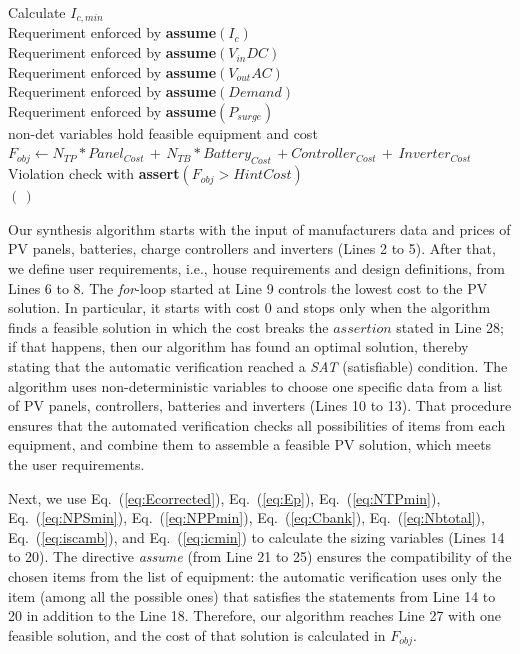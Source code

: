 \documentclass[10pt,conference]{IEEEtran}
\begin{document}
\begin{algorithm}
\begin{algorithmic}[1]
\begin{scriptsize}
 	\STATE Calculate $I_{c,min}$ \\
 	\STATE Requeriment enforced by \textbf{assume}$(I_{c})$ \\
	\STATE Requeriment enforced by \textbf{assume}$(V_{in}DC)$ \\
	\STATE Requeriment enforced by \textbf{assume}$(V_{out}AC)$ \\
	\STATE Requeriment enforced by \textbf{assume}$(Demand)$ \\
	\STATE Requeriment enforced by \textbf{assume}$(P_{surge})$ \\
	\STATE non-det variables hold feasible equipment and cost  \\
	\STATE $F_{obj} \leftarrow  N_{TP}*Panel_{Cost} \, + \, N_{TB}*Battery_{Cost} \, + Controller_{Cost} \, + \, Inverter_{Cost}$ \\
	\STATE Violation check with \textbf{assert}$(F_{obj} > HintCost)$ \\
  \ENDFOR
 \RETURN $(\,)$ 
  \end{scriptsize}
 \end{algorithmic} 
 \label{alg:verification-algorithm}
 \end{algorithm}
 
Our synthesis algorithm starts with the input of manufacturers data and prices of PV panels, batteries, charge controllers and inverters (Lines 2 to 5). After that, we define user requirements, i.e., house requirements and design definitions, from Lines 6 to 8. The \textit{for}-loop started at Line 9 controls the lowest cost to the PV solution. In particular, it starts with cost $0$ and stops only when the algorithm finds a feasible solution in which the cost breaks the $assertion$ stated in Line 28; if that happens, then our algorithm has found an optimal solution, thereby stating that the automatic verification reached a \textit{SAT} (satisfiable) condition. The algorithm uses non-deterministic variables to choose one specific data from a list of PV panels, controllers, batteries and inverters (Lines 10 to 13). That procedure ensures that the automated verification checks all possibilities of items from each equipment, and combine them to assemble a feasible PV solution, which meets the user requirements.

Next, we use Eq.~(\ref{eq:Ecorrected}), Eq.~(\ref{eq:Ep}), Eq.~(\ref{eq:NTPmin}), Eq.~(\ref{eq:NPSmin}), Eq.~(\ref{eq:NPPmin}), Eq.~(\ref{eq:Cbank}), Eq.~(\ref{eq:Nbtotal}), Eq.~(\ref{eq:iscamb}), and Eq.~(\ref{eq:icmin}) to calculate the sizing variables (Lines 14 to 20). The directive \textit{assume} (from Line 21 to 25) ensures the compatibility of the chosen items from the list of equipment: the automatic verification uses only the item (among all the possible ones) that satisfies the statements from Line 14 to 20 in addition to the Line 18. Therefore, our algorithm reaches Line 27 with one feasible solution, and the cost of that solution is calculated in $F_{obj}$.
\end{document}
